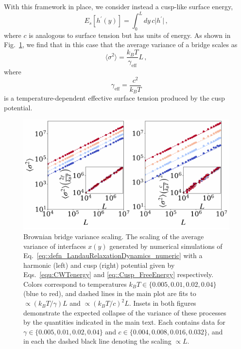 \documentclass[twoside,twocolumn,9pt]{article}
\begin{document}
With this framework in place, we consider instead a cusp-like surface energy,
\begin{equation}
    \label{eq::Cusp_FreeEnergy}
    E_s[{h}^{\prime}(y)] = \int_{0}^{L}dy\,c\big|h^{\prime}\big|\, ,
\end{equation}
where $c$ is analogous to surface tension but has units of energy. As shown in Fig.~\ref{fig:brownianBridge}, we find that in this case that the average variance of a bridge scales as
\begin{equation}
    \label{eq::varianceCusp}
    \langle\sigma^{2}\rangle = \frac{k_{B}T}{\gamma_{\text{eff}}}L\,,
\end{equation}
where
\begin{equation}
    \label{eq:cuspSurfaceTension}
    \gamma_{\text{eff}} = \frac{c^{2}}{k_{B}T}
\end{equation}
is a temperature-dependent effective surface tension produced by the cusp potential.

\begin{figure}[t]
    \centering    
    \includegraphics[width=0.95\columnwidth]{Figure1.pdf}
    \caption{Brownian bridge variance scaling. The scaling of the average variance of interfaces $x(y)$ generated by numerical simulations of Eq.~\ref{eq::defn_LandauRelaxationDynamics_numeric} with a harmonic (left) and cusp (right) potential given by Eqs.~\ref{equ:CWTenergy} and \ref{eq::Cusp_FreeEnergy} respectively. Colors correspond to temperatures $k_{B}T\in\{0.005, 0.01, 0.02, 0.04\}$ (blue to red), and dashed lines in the main plot are fits to $\propto({k_BT}/\gamma)L$ and $\propto({k_{B}T}/c)^{2}L$. Insets in both figures demonstrate the expected collapse of the variance of these processes by the quantities indicated in the main text. Each contains data for $\gamma\in\{0.005, 0.01, 0.02, 0.04\}$ and $c\in\{0.004, 0.008, 0.016, 0.032\}$, and in each the dashed black line denoting the scaling $\propto{L}$.}
    \label{fig:brownianBridge}
\end{figure}
\end{document}
